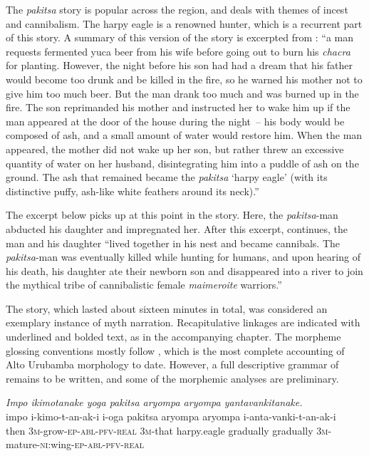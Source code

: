 \documentclass[output=paper]{LSP/langsci}
\begin{document}
The \textit{pakitsa} story is popular across the region, and deals with themes of incest and cannibalism. The harpy eagle is a renowned hunter, which is a recurrent part of this story. A summary of this version of the story is excerpted from \citet[][255--256]{emlen14}: ``a man requests fermented yuca beer from his wife before going out to burn his \textit{chacra} for planting. However, the night before his son had had a dream that his father would become too drunk and be killed in the fire, so he warned his mother not to give him too much beer. But the man drank too much and was burned up in the fire. The son reprimanded his mother and instructed her to wake him up if the man appeared at the door of the house during the night~-- his body would be composed of ash, and a small amount of water would restore him. When the man appeared, the mother did not wake up her son, but rather threw an excessive quantity of water on her husband, disintegrating him into a puddle of ash on the ground. The ash that remained became the \textit{pakitsa} `harpy eagle' (with its distinctive puffy, ash-like white feathers around its neck).'' 

The excerpt below picks up at this point in the story. Here, the \textit{pakitsa}-man abducted his daughter and impregnated her. After this excerpt, \citet[][256]{emlen14} continues, the man and his daughter ``lived together in his nest and became cannibals. The \textit{pakitsa}-man was eventually killed while hunting for humans, and upon hearing of his death, his daughter ate their newborn son and disappeared into a river to join the mythical tribe of cannibalistic female \textit{maimeroite} warriors.'' 

The story, which lasted about sixteen minutes in total, was considered an exemplary instance of myth narration. Recapitulative linkages are indicated with underlined and bolded text, as in the accompanying chapter. The morpheme glos\-sing conventions mostly follow \citet{vargas13}, which is the most complete accounting of {Alto Urubamba}  morphology to date. However, a full descriptive grammar of  remains to be written, and some of the morphemic analyses are preliminary.


\begin{exe}
 \label{Emapp01}
\glt \textit{Impo ikimotanake yoga pakitsa aryompa aryompa yantavankitanake.}\\
\gll impo i-kimo-t-an-ak-i i-oga pakitsa aryompa aryompa i-anta-vanki-t-an-ak-i\\
then \textsc{3m-}grow\textsc{-ep-abl-pfv-real} \textsc{3m-}that harpy.eagle gradually gradually \textsc{3m-}mature-\textsc{ni:}wing\textsc{-ep-abl-pfv-real}\\
\glt {}\\
\end{exe}
\end{document}
